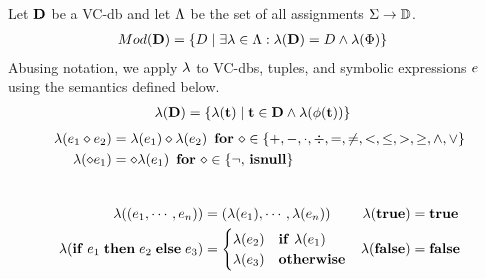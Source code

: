 \begin{defi}[$\worldsOf{\vcdb}$]\label{def:vcdb-worlds}
  Let $\mathbf{D}$ be a VC-db and let $\Lambda$ be the set of all assignments $\Sigma \to \mathbb{D}$.
  \begin{align*}
Mod({\mathbf{D}}) &= \{ D \mid \exists \lambda \in \Lambda: \lambda(\mathbf{D}) = D \land \lambda(\Phi)\}
  \end{align*}
Abusing notation, we apply $\lambda$ to VC-dbs, tuples, and symbolic expressions $e$ using the semantics defined below.
  \begin{align*}
\lambda(\mathbf{D}) &= \{ \lambda(\mathbf{t}) \mid \mathbf{t} \in \mathbf{D} \land \lambda(\phi(\mathbf{t})) \}
  \end{align*}
  \begin{align*}
        \lambda(e_1 \diamond e_2) &= \lambda(e_1) \diamond \lambda(e_2) \,\,\,\text{\textbf{for}}\,\, \diamond \in \{+,-,\cdot,\div,=,\neq,<,\leq,>,\geq,\land,\lor\}\\
        \lambda(\diamond e_1) &= \diamond \lambda(e_1)
    \,\,\,\text{\textbf{for}}\,\, \diamond \in \{\neg, \,\mathbf{isnull}\}
  \end{align*}\\[-9mm]
  \begin{align*}
    \lambda( (e_1, \cdots, e_n)) &= (\lambda(e_1), \cdots, \lambda(e_n))     &\lambda(\mathbf{true}) &= \mathbf{true}  \\
        \lambda(\mathbf{if}\thickspace e_1 \thickspace \mathbf{then} \thickspace e_2 \thickspace \mathbf{else} \thickspace e_3) &=
                                          \begin{cases}
                                            \lambda(e_2) &\mathbf{if}\,\,\lambda(e_1)\\
                                            \lambda(e_3) &\mathbf{otherwise}\\
                                          \end{cases}
    &\lambda(\mathbf{false}) &= \mathbf{false}\\
  \end{align*}

\end{defi}
